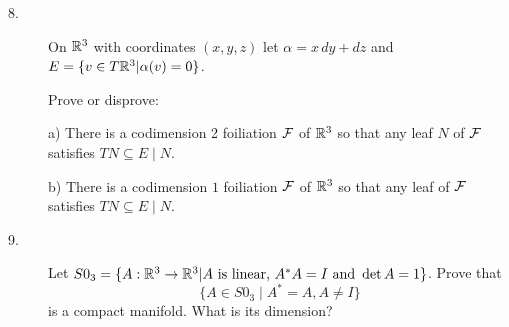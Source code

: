 \documentclass[bbb]{report}
\def\R{{\Bbb R}}
\begin{document}
\begin{large}
\begin{description}
\vspace{.2in}
\item[8.]
On $\R^3$ with coordinates $(x,y,z)$ let
$\alpha=x\,dy+dz$ and $E=\{v\in T\R^3|\alpha(v)=0\}$.

\item[\quad] Prove or disprove:

\item[\quad] a) There is a codimension 2 foiliation $\cal F$
of $\R^3$ so that any leaf $N$ of $\cal F$
satisfies $TN\subseteq E\mid N$.

\item[\quad] b)
There is a codimension $1$ foiliation $\cal F$ of $\R^3$
so that any leaf of $\cal F$ satisfies $TN\subseteq E\mid N$.


\vspace{.2in}
\item[9.]
Let $S0_3=\{A:\R^3\to\R^3|A\ \hbox{is linear,}
\ A^\ast A=I\ \hbox{and}\ \det A=1\}$.
Prove that
$$\{A\in S0_3\mid A^\ast=A, A\not= I\}$$
 is a compact manifold.
What is its dimension?

\vfill
\clearpage


\end{description}
\end{large}
\end{document}
